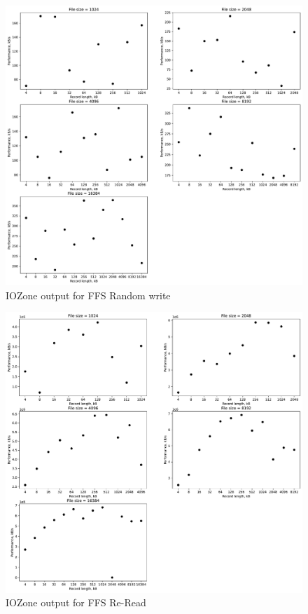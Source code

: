 \begin{figure}[!htb]
	\label{fig:app_bench_ffs_rnd_read}
	\begin{center}
		\includegraphics[width=1.0\textwidth]{figures/benchmarking/ffs/Random write.pdf}
	\end{center}
	\caption{IOZone output for FFS Random write}
\end{figure}

\begin{figure}[!htb]
	\label{fig:app_bench_ffs_rnd_read}
	\begin{center}
		\includegraphics[width=1.0\textwidth]{figures/benchmarking/ffs/Re-Reader.pdf}
	\end{center}
	\caption{IOZone output for FFS Re-Read}
\end{figure}

